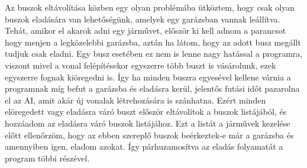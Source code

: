 Az buszok eltávolítása közben egy olyan problémába ütköztem, hogy csak olyan buszok eladására van lehetőségünk, amelyek egy garázsban vannak leállítva. Tehát, amikor el akarok adni egy járművet, először ki kell adnom a parancsot hogy menjen a legközelebbi garázsba, aztán ha látom, hogy az adott busz megállt tudjuk csak eladni. Egy busz esetében ez nem is lenne nagy hatással a programra, viszont mivel a vonal felépítésekor egyszerre több buszt is vásárolunk, ezek egyszerre fognak kiöregedni is. Így ha minden buszra egyesével kellene várnia a programnak míg befut a garázsba és eladásra kerül, jelentős futási időt pazarolna el az AI, amit akár új vonalak létrehozására is szánhatna. Ezért minden elöregedett vagy eladásra váró buszt először eltávolítok a buszok listájából, és hozzáadom az eladásra váró buszok listájához. Ezt a listát a járművek kezelése előtt ellenőrzöm, hogy az ebben szereplő buszok beérkeztek-e már a garázsba és amennyiben igen, eladom azokat. Így párhuzamosítva az eladás folyamatát a program többi részével.
